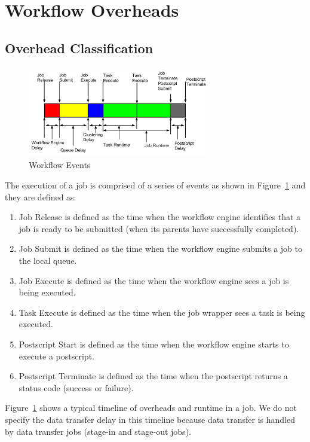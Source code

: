 \section{Workflow Overheads}
\label{sec:overheads}
\subsection{Overhead Classification}


\begin{figure}[h!]
	\centering
    \includegraphics[width=0.7\textwidth]{figures/model/Job_Timeline.pdf}
    \caption{Workflow Events}
    \label{fig:model_overhead}
\end{figure}


The execution of a job is comprised of a series of events as shown in Figure~\ref{fig:model_overhead} and they are defined as:
\begin{enumerate}
\item Job Release is defined as the time when the workflow engine identifies that a job is ready to be submitted (when its parents have successfully completed). 
\item Job Submit is defined as the time when the workflow engine submits a job to the local queue. 
\item Job Execute is defined as the time when the workflow engine sees a job is being executed. 
\item Task Execute is defined as the time when the job wrapper sees a task is being executed. 

\item Postscript Start is defined as the time when the workflow engine starts to execute a postscript. 
\item Postscript Terminate is defined as the time when the postscript returns a status code (success or failure). 
\end{enumerate}

Figure~\ref{fig:model_overhead} shows a typical timeline of overheads and runtime in a job. We do not specify the data transfer delay in this timeline because data transfer is handled by data transfer jobs (stage-in and stage-out jobs). 

